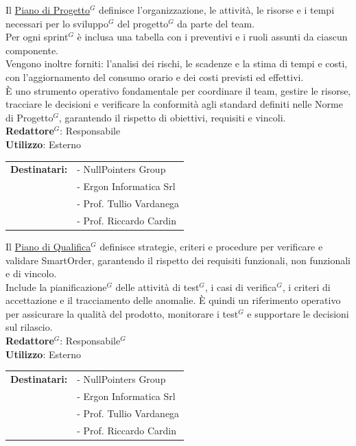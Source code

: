 	Il \href{https://nullpointersgroup.github.io/Documentazione/output/PB/Documenti%20Esterni/Piano_di_Progetto.pdf}{Piano di Progetto$^G$} 
	definisce l’organizzazione, le attività, le risorse e i tempi necessari per lo sviluppo$^G$ del progetto$^G$ da parte del team. \\
	Per ogni sprint$^G$ è inclusa una tabella con i preventivi e i ruoli assunti da ciascun componente. \\
	Vengono inoltre forniti: l'analisi dei rischi, le scadenze e la stima di tempi e costi, con l'aggiornamento del consumo orario e dei costi previsti ed effettivi.\\ 
	È uno strumento operativo fondamentale per coordinare il team, gestire le risorse, tracciare le decisioni e verificare la conformità agli standard definiti nelle Norme di Progetto$^G$, garantendo il rispetto di obiettivi, requisiti e vincoli.\\[0.5em]
	\medskip
	\textbf{Redattore$^G$}: Responsabile\\
	\medskip
	\textbf{Utilizzo}: Esterno\\
	\medskip 
	\begin{tabular}{@{}l l}
		\textbf{Destinatari:} & - NullPointers Group\\
		                      & - Ergon Informatica Srl\\
		                      & - Prof. Tullio Vardanega\\
							  & - Prof. Riccardo Cardin
	\end{tabular}

	Il \href{https://nullpointersgroup.github.io/Documentazione/output/PB/Documenti%20Esterni/Piano_di_Qualifica.pdf}{Piano di Qualifica$^G$} 
	definisce strategie, criteri e procedure per verificare e validare SmartOrder, garantendo il rispetto dei requisiti funzionali, non funzionali e di vincolo.\\
	Include la pianificazione$^G$ delle attività di test$^G$, i casi di verifica$^G$, i criteri di accettazione e il tracciamento delle anomalie. È quindi un riferimento operativo per assicurare la qualità del prodotto, monitorare i test$^G$ e supportare le decisioni sul rilascio.\\[0.5em]
	\medskip
	\textbf{Redattore$^G$}: Responsabile$^G$ \\
	\medskip
	\textbf{Utilizzo}: Esterno\\
	\medskip 
	\begin{tabular}{@{}l l}
		\textbf{Destinatari:} & - NullPointers Group\\
		                      & - Ergon Informatica Srl\\
		                      & - Prof. Tullio Vardanega\\
							  & - Prof. Riccardo Cardin
	\end{tabular}

